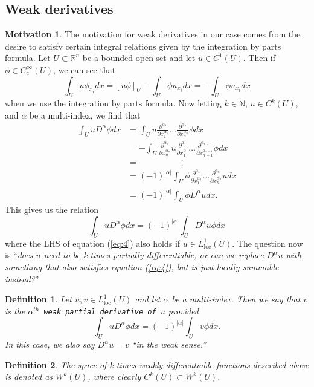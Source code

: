 \documentclass[11pt]{article}
\newtheorem{definition}{Definition}
\theoremstyle{definition}
\newtheorem*{motivation}{Motivation}
\begin{document}
\subsection{Weak derivatives}
\begin{motivation}
	The motivation for weak derivatives in our case comes from the desire to satisfy certain integral relations given by the integration by parts formula.
	Let $U \subset \mathbb{R}^n$ be a bounded open set and let $u\in C^1(U)$. Then if $\phi \in C_{c}^{\infty}(U)$, we can see that
	\begin{equation*}
		\int_U u\phi_{x_i}dx = [u\phi]_U - \int_U \phi u_{x_i}dx = - \int_U \phi u_{x_i}dx
	\end{equation*}
	when we use the integration by parts formula. Now letting $k\in \mathbb{N}$, $u \in C^k(U)$, and $\alpha$ be a multi-index, we find that
	\begin{equation*}
		\begin{aligned}
			\int_U u D^{\alpha}\phi dx &= \int_U u \frac{\partial^{\alpha_1}}{\partial x_1^{\alpha_1}}\dots\frac{\partial^{\alpha_n}}{\partial x_n^{\alpha_n}}\phi dx \\
						   &= - \int_U \frac{\partial^{\alpha_n}}{\partial x_n^{\alpha_n}}u \frac{\partial^{\alpha_1}}{\partial x_1^{\alpha_1}}\dots\frac{\partial^{\alpha_{n-1}}}{\partial x_{n-1}^{\alpha_{n-1}}}\phi dx \\
						   &= \quad\qquad\qquad\vdots \\ 
						   &= (-1)^{|\alpha|}\int_U \phi\frac{\partial^{\alpha_1}}{\partial x_1^{\alpha_1}}\dots\frac{\partial^{\alpha_n}}{\partial x_n^{\alpha_n}}u dx \\
						   &= (-1)^{|\alpha|}\int_U \phi D^{\alpha}u dx.
		\end{aligned}
	\end{equation*}
	This gives us the relation
	\begin{equation}
		\label{eq:4}
		\int_U u D^{\alpha}\phi dx = (-1)^{|\alpha|}\int_U D^{\alpha}u\phi  dx
	\end{equation}
	where the LHS of equation (\ref{eq:4}) also holds if $u\in L_{\text{loc}}^1(U)$.
	The question now is ``\textit{does $u$ need to be k-times partially differentiable, or can we replace $D^{\alpha}u$ with something that also satisfies
	equation (\ref{eq:4}), but is just locally summable instead?}''
\end{motivation}
\begin{definition}
	Let $u,v \in L_{\text{loc}}^1(U)$ and let $\alpha$ be a multi-index. Then we say that $v$ is the 
	\texttt{$\alpha^{th}$ weak partial derivative of $u$} provided
	\begin{equation*}
		\int_U u D^{\alpha}\phi dx = (-1)^{|\alpha|}\int_U v \phi dx.
	\end{equation*}
	In this case, we also say $D^{\alpha}u = v$ ``in the weak sense.''
\end{definition}
\begin{definition}
	The space of k-times weakly differentiable functions described above is denoted as $W^k(U)$, where clearly $C^k(U) \subset W^k(U)$.
\end{definition}
\newpage
\end{document}
